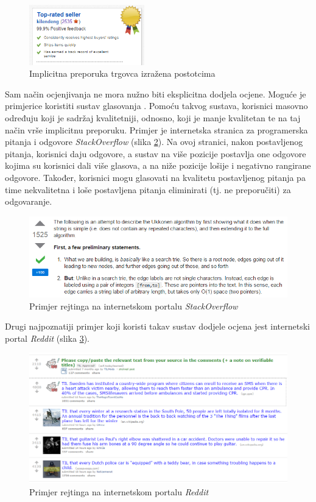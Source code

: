 \documentclass[times, utf8, diplomski, numeric]{fer}
\begin{document}
\begin{figure}[htb]
	\centering
	\includegraphics[width=5cm]{images/neosobni/ebay2.png}
	\caption{Implicitna preporuka trgovca izražena postotcima}
	\label{fig:Ebay2}
\end{figure}

Sam način ocjenjivanja ne mora nužno biti eksplicitna dodjela ocjene. Moguće je
primjerice koristiti sustav glasovanja  . Pomoću takvog sustava, korisnici masovno određuju koji je sadržaj
kvalitetniji, odnosno, koji je manje kvalitetan te na taj način vrše implicitnu
preporuku. Primjer je internetska stranica za programerska pitanja i odgovore
\emph{StackOverflow} (slika \ref{fig:stackoverflow1}). Na ovoj stranici, nakon
postavljenog pitanja, korisnici daju odgovore, a sustav na više pozicije
postavlja one odgovore kojima su korisnici dali više glasova, a na niže pozicije
lošije i negativno rangirane odgovore. Također, korisnici mogu glasovati na
kvalitetu postavljenog pitanja pa time nekvalitetna i loše postavljena pitanja
eliminirati (tj. ne preporučiti) za odgovaranje. 

\begin{figure}[htb]
	\centering
	\includegraphics[width=14.21cm]{images/neosobni/stackoverflow1.png}
	\caption{Primjer rejtinga na internetskom portalu \emph{StackOverflow}}
	\label{fig:stackoverflow1}
\end{figure}

Drugi najpoznatiji primjer koji koristi takav sustav dodjele ocjena jest
internetski portal \emph{Reddit} (slika \ref{fig:reddit1}).
\begin{figure}[htb]
	\centering
	\includegraphics[width=14.21cm]{images/neosobni/reddit1.png}
	\caption{Primjer rejtinga na internetskom portalu \emph{Reddit}}
	\label{fig:reddit1}
\end{figure}
\end{document}
